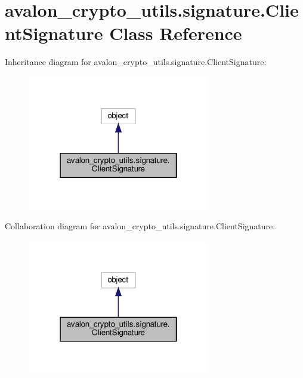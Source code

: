 \hypertarget{classavalon__crypto__utils_1_1signature_1_1ClientSignature}{}\section{avalon\+\_\+crypto\+\_\+utils.\+signature.\+Client\+Signature Class Reference}
\label{classavalon__crypto__utils_1_1signature_1_1ClientSignature}


Inheritance diagram for avalon\+\_\+crypto\+\_\+utils.\+signature.\+Client\+Signature\+:
\nopagebreak
\begin{figure}[H]
\begin{center}
\leavevmode
\includegraphics[width=226pt]{classavalon__crypto__utils_1_1signature_1_1ClientSignature__inherit__graph}
\end{center}
\end{figure}


Collaboration diagram for avalon\+\_\+crypto\+\_\+utils.\+signature.\+Client\+Signature\+:
\nopagebreak
\begin{figure}[H]
\begin{center}
\leavevmode
\includegraphics[width=226pt]{classavalon__crypto__utils_1_1signature_1_1ClientSignature__coll__graph}
\end{center}
\end{figure}
